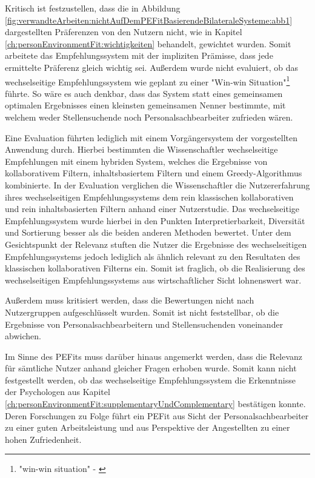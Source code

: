 Kritisch ist festzustellen, dass die in Abbildung \ref{fig:verwandteArbeiten:nichtAufDemPEFitBasierendeBilateraleSysteme:abb1} dargestellten Präferenzen von den Nutzern nicht, wie in Kapitel \ref{ch:personEnvironmentFit:wichtigkeiten} behandelt, gewichtet wurden. Somit arbeitete das Empfehlungssystem mit der impliziten Prämisse, dass jede ermittelte Präferenz gleich wichtig sei. Außerdem wurde nicht evaluiert, ob das wechselseitige Empfehlungssystem wie geplant zu einer "Win-win Situation"\footnote{"win-win situation" - \textcite[S. 3, Z. 45f.]{wenxing:2015}} \cite[S. 3, Z. 45f.]{wenxing:2015} führte. So wäre es auch denkbar, dass das System statt eines gemeinsamen optimalen Ergebnisses einen kleinsten gemeinsamen Nenner bestimmte, mit welchem weder Stellensuchende noch Personalsachbearbeiter zufrieden wären.

Eine Evaluation führten lediglich \textcite[S. 1ff.]{hong:2013b} mit einem Vorgängersystem der vorgestellten Anwendung durch. Hierbei bestimmten die Wissenschaftler wechselseitige Empfehlungen mit einem hybriden System, welches die Ergebnisse von kollaborativem Filtern, inhaltsbasiertem Filtern und einem Greedy-Algorithmus kombinierte. In der Evaluation verglichen die Wissenschaftler die Nutzererfahrung ihres wechselseitigen Empfehlungssystems dem rein klassischen kollaborativen und rein inhaltsbasierten Filtern anhand einer Nutzerstudie. Das wechselseitige Empfehlungssystem wurde hierbei in den Punkten Interpretierbarkeit, Diversität und Sortierung besser als die beiden anderen Methoden bewertet. Unter dem Gesichtspunkt der Relevanz stuften die Nutzer die Ergebnisse des wechselseitigen Empfehlungssystems jedoch lediglich als ähnlich relevant zu den Resultaten des klassischen kollaborativen Filterns ein. Somit ist fraglich, ob die Realisierung des wechselseitigen Empfehlungssystems aus wirtschaftlicher Sicht lohnenswert war.

Außerdem muss kritisiert werden, dass die Bewertungen nicht nach Nutzergruppen aufgeschlüsselt wurden. Somit ist nicht feststellbar, ob die Ergebnisse von Personalsachbearbeitern und Stellensuchenden voneinander abwichen.

Im Sinne des \acp{PEFit} muss darüber hinaus angemerkt werden, dass die Relevanz für sämtliche Nutzer anhand gleicher Fragen erhoben wurde. Somit kann nicht festgestellt werden, ob das wechselseitige Empfehlungssystem die Erkenntnisse der Psychologen aus Kapitel \ref{ch:personEnvironmentFit:supplementaryUndComplementary} bestätigen konnte. Deren Forschungen zu Folge führt ein \ac{PEFit} aus Sicht der Personalsachbearbeiter zu einer guten Arbeitsleistung und aus Perspektive der Angestellten zu einer hohen Zufriedenheit.

